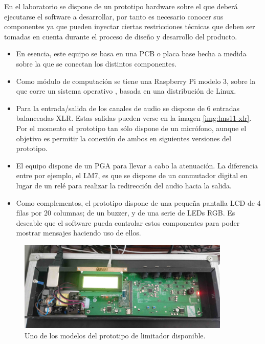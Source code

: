 En el laboratorio se dispone de un prototipo hardware sobre el que deberá ejecutarse el software a desarrollar, por tanto es necesario conocer sus componentes ya que pueden inyectar ciertas restricciones técnicas que deben ser tomadas en cuenta durante el proceso de diseño y desarrollo del producto.

\begin{itemize}

	\item En esencia, este equipo se basa en una \acrshort{PCB} o placa base hecha a medida sobre la que se conectan los distintos componentes.
	\item Como módulo de computación se tiene una Raspberry Pi modelo 3, sobre la que corre un sistema operativo , basada en una distribución de Linux.

	\item Para la entrada/salida de los canales de audio se dispone de 6 entradas balanceadas \acrshort{XLR}. Estas salidas pueden verse en la imagen \ref{img:lms11-xlr}. Por el momento el prototipo tan sólo dispone de un micrófono, aunque el objetivo es permitir la conexión de ambos en siguientes versiones del prototipo.

	\item El equipo dispone de un \acrshort{PGA} para llevar a cabo la atenuación. La diferencia entre por ejemplo, el \acrshort{LM7}, es que se dispone de un conmutador digital en lugar de un relé para realizar la redirección del audio hacia la salida.

	\item Como complementos, el prototipo dispone de una pequeña pantalla \acrshort{LCD} de 4 filas por 20 columnas; de un buzzer, y de una serie de \acrshort{LED}s RGB. Es deseable que el software pueda controlar estos componentes para poder mostrar mensajes haciendo uso de ellos.
\end{itemize}

\begin{figure}[h]
    \centering
    \includegraphics[width=0.9\textwidth]{imagenes/lm7-fotos/lms11.jpg}
    \caption{Uno de los modelos del prototipo de limitador disponible.}
    \label{img:lms11-hw}
\end{figure}

